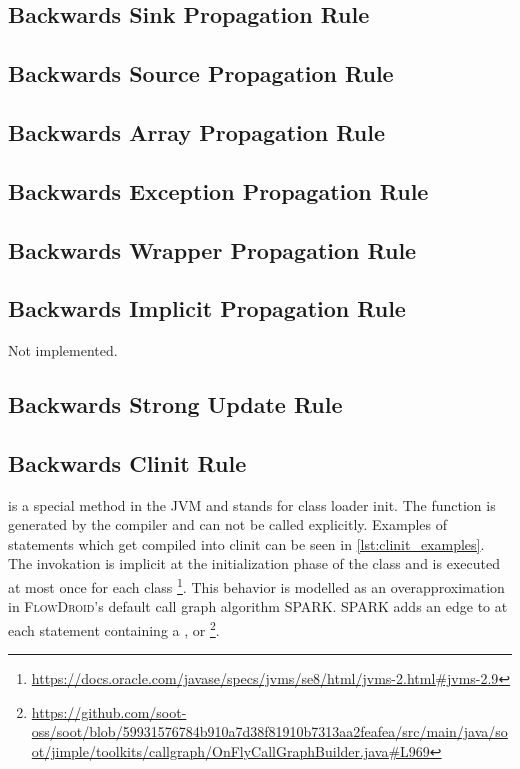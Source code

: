 \documentclass[../draft.tex]{subfiles}
\begin{document}
    \subsection{Backwards Sink Propagation Rule}


    \subsection{Backwards Source Propagation Rule}\label{s:sourcerule}

    \subsection{Backwards Array Propagation Rule}

    \subsection{Backwards Exception Propagation Rule}

    \subsection{Backwards Wrapper Propagation Rule}

    \subsection{Backwards Implicit Propagation Rule}
    Not implemented.

    \subsection{Backwards Strong Update Rule}

    \subsection{Backwards Clinit Rule}\label{s:clinitrule}
     is a special method in the JVM and stands for class loader init. The function is generated by the compiler and can not be called explicitly. Examples of statements which get compiled into clinit can be seen in \autoref{lst:clinit_examples}. The invokation is implicit at the initialization phase of the class and is executed at most once for each class \footnote{\url{https://docs.oracle.com/javase/specs/jvms/se8/html/jvms-2.html\#jvms-2.9}}. 
    This behavior is modelled as an overapproximation in \textsc{FlowDroid}'s default call graph algorithm SPARK. SPARK adds an edge to  at each statement containing a ,  or  \footnote{\url{https://github.com/soot-oss/soot/blob/59931576784b910a7d38f81910b7313aa2feafea/src/main/java/soot/jimple/toolkits/callgraph/OnFlyCallGraphBuilder.java\#L969}}.
   
\end{document}
